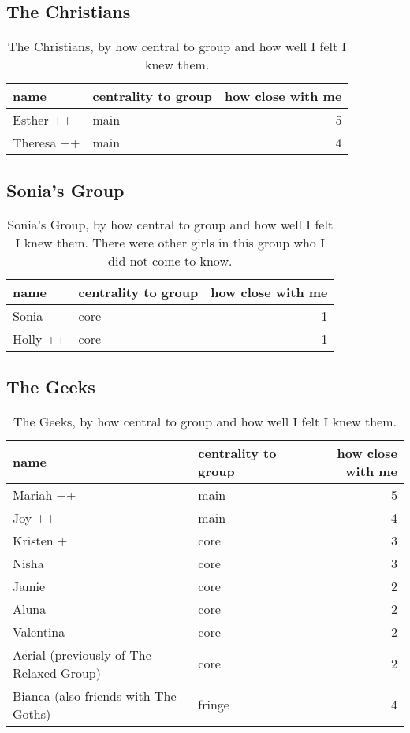 \subsection{The Christians}
\nopagebreak
\begin{table}[ht]
\caption{The Christians, by how central to group and how well I felt I knew them.}\label{append:Christians}
	\centering
		\begin{tabular}{llr} \\
		\hline
							name & centrality to group & how close with me  \\
			\hline
Esther ++ & main & 5 \\
Theresa ++ & main & 4 \\
\hline
				\end{tabular}
\end{table}

\subsection{Sonia's Group}
\nopagebreak
\begin{table}[ht]
\caption{Sonia's Group, by how central to group and how well I felt I knew them.  There were other girls in this group who I did not come to know.}\label{append:Sonia}
	\centering
		\begin{tabular}{llr} \\
		\hline
							name & centrality to group & how close with me  \\
			\hline
		Sonia & core & 1 \\
		Holly ++ & core & 1 \\
		   \hline
				\end{tabular}
\end{table}

\pagebreak
\subsection{The Geeks}
\nopagebreak
\begin{table}[ht]
\caption{The Geeks, by how central to group and how well I felt I knew them.}\label{append:Geeks}
	\centering
		\begin{tabular}{llr} \\
		\hline
							name & centrality to group & how close with me  \\
			\hline
Mariah ++ & main & 5 \\
Joy ++   & main & 4 \\
Kristen + & core & 3 \\
Nisha  &  core  &  3 \\
Jamie  & core & 2 \\
Aluna & core & 2 \\
Valentina & core & 2 \\
Aerial (previously of The Relaxed Group) & core & 2 \\
Bianca (also friends with The Goths) & fringe & 4 \\
   \hline
				\end{tabular}
\end{table}


